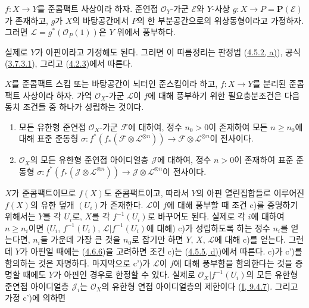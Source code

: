\begin{corollary}[4.6.7]
\label{II.4.6.7-ko}
$f:X\to Y$를 준콤팩트 사상이라 하자. 준연접 $\mathcal{O}_Y$-가군
$\mathcal{E}$와 $Y$-사상 $g:X\to P=\mathbf{P}(\mathcal{E})$가 존재하고,
$g$가 $X$의 바탕공간에서 $P$의 한 부분공간으로의 위상동형이라고
가정하자. 그러면
$\mathcal{L}=g^*(\mathcal{O}_P(1))$은 $Y$ 위에서 풍부하다.
\end{corollary}

실제로 $Y$가 아핀이라고 가정해도 된다. 그러면 이 따름정리는 판정법
(\hyperref[II.4.5.2-ko]{4.5.2, a)}), 공식
(\hyperref[II.3.7.3.1-ko]{3.7.3.1}), 그리고
(\hyperref[II.4.2.3-ko]{4.2.3})에서 따른다.

\begin{proposition}[4.6.8]
\label{II.4.6.8-ko}
$X$를 준콤팩트 스킴 또는 바탕공간이 뇌터인 준스킴이라 하고,
$f:X\to Y$를 분리된 준콤팩트 사상이라 하자. 가역
$\mathcal{O}_X$-가군 $\mathcal{L}$이 $f$에 대해 풍부하기 위한
필요충분조건은 다음 동치 조건들 중 하나가 성립하는 것이다.
\begin{enumerate}
  \item[\rm{c)}] 모든 유한형 준연접 $\mathcal{O}_X$-가군
  $\mathcal{F}$에 대하여, 정수 $n_0>0$이 존재하여 모든 $n\geq n_0$에
  대해 표준 준동형
  $\sigma:f^*(f_*(\mathcal{F}\otimes\mathcal{L}^{\otimes n}))\to
  \mathcal{F}\otimes\mathcal{L}^{\otimes n}$이 전사이다.
  \item[\rm{c')}] $\mathcal{O}_X$의 모든 유한형 준연접 아이디얼층
  $\mathcal{J}$에 대하여, 정수 $n>0$이 존재하여 표준 준동형
  $\sigma:f^*(f_*(\mathcal{J}\otimes\mathcal{L}^{\otimes n}))\to
  \mathcal{J}\otimes\mathcal{L}^{\otimes n}$이 전사이다.
\end{enumerate}
\end{proposition}

$X$가 준콤팩트이므로 $f(X)$도 준콤팩트이고, 따라서 $Y$의 아핀
열린집합들로 이루어진 $f(X)$의 유한 덮개 $(U_i)$가 존재한다.
$\mathcal{L}$이 $f$에 대해 풍부할 때 조건 c)를 증명하기 위해서는
$Y$를 각 $U_i$로, $X$를 각 $f^{-1}(U_i)$로 바꾸어도 된다. 실제로 각
$i$에 대하여 $n\geq n_i$이면 ($U_i$, $f^{-1}(U_i)$,
$\mathcal{L}|f^{-1}(U_i)$에 대해) c)가 성립하도록 하는 정수 $n_i$를
얻는다면, $n_i$들 가운데 가장 큰 것을 $n_0$로 잡기만 하면 $Y$, $X$,
$\mathcal{L}$에 대해 c)를 얻는다. 그런데 $Y$가 아핀일 때에는
(\hyperref[II.4.6.6-ko]{4.6.6})을 고려하면 조건 c)는
(\hyperref[II.4.5.5-ko]{4.5.5, d)})에서 따른다. c)가 c')를 함의하는
것은 자명하다. 마지막으로 c')가 $\mathcal{L}$이 $f$에 대해 풍부함을
함의한다는 것을 증명할 때에도 $Y$가 아핀인 경우로 한정할 수 있다.
실제로 $\mathcal{O}_X|f^{-1}(U_i)$의 모든 유한형 준연접 아이디얼층
$\mathcal{J}_i$는 $\mathcal{O}_X$의 유한형 연접 아이디얼층의 제한이다
(\hyperref[I.9.4.7-ko]{I, 9.4.7}). 그리고 가정 c')에 의하면

